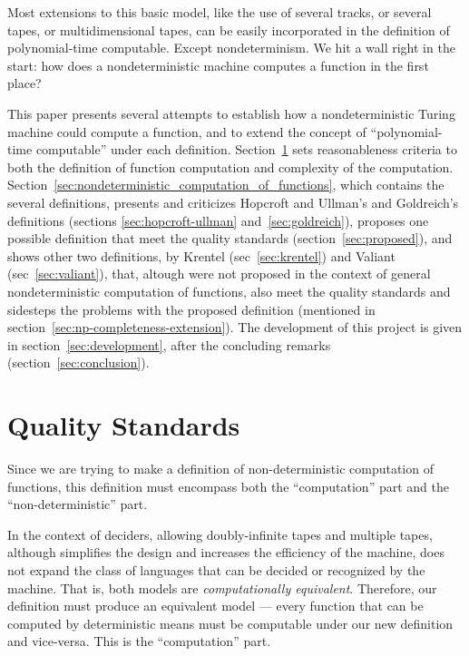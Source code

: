 \documentclass[12pt]{article}
\theoremstyle{definition}
\begin{document}
Most extensions to this basic model,
like the use of several tracks, or several tapes, or multidimensional tapes,
can be easily incorporated in the definition of polynomial-time computable.
Except nondeterminism.
We hit a wall right in the start:
how does a nondeterministic machine computes a function in the first place?

This paper presents several attempts to establish
how a nondeterministic Turing machine could compute a function,
and to extend the concept of ``polynomial-time computable'' under each definition.
Section~\ref{sec:quality-standards} sets reasonableness criteria
to both the definition of function computation and complexity of the computation.
Section~\ref{sec:nondeterministic_computation_of_functions},
which contains the several definitions,
presents and criticizes Hopcroft and Ullman's and Goldreich's definitions
(sections \ref{sec:hopcroft-ullman} and~\ref{sec:goldreich}),
proposes one possible definition that meet the quality standards
(section~\ref{sec:proposed}),
and shows other two definitions,
by Krentel (sec~\ref{sec:krentel}) and Valiant (sec~\ref{sec:valiant}),
that, altough were not proposed in the context
of general nondeterministic computation of functions,
also meet the quality standards and sidesteps the problems with the proposed definition
(mentioned in section~\ref{sec:np-completeness-extension}).
The development of this project is given in section~\ref{sec:development},
after the concluding remarks (section~\ref{sec:conclusion}).

\section{Quality Standards}
\label{sec:quality-standards}

Since we are trying to make a definition of non-deterministic computation of functions,
this definition must encompass both
the ``computation'' part and the ``non-deterministic'' part.

In the context of deciders,
allowing doubly-infinite tapes and multiple tapes,
although simplifies the design and increases the efficiency of the machine,
does not expand the class of languages that can be decided or recognized by the machine.
That is, both models are \emph{computationally equivalent}.
Therefore,
our definition must produce an equivalent model
--- every function that can be computed by deterministic means
must be computable under our new definition and vice-versa.
This is the ``computation'' part.
\end{document}

